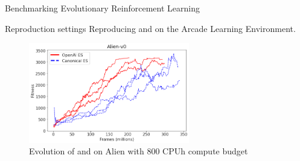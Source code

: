 \begin{frame}{\tcii{} Benchmarking Evolutionary Reinforcement Learning}

    \begin{block}{Reproduction settings}
        Reproducing \canonical{} \canonicalpaper{} and \openaies{} \openaipaper{} on the Arcade Learning Environment.
    \end{block}
    
    \begin{center}
        \begin{figure}
            \includegraphics[width=7cm]{images/BERL/Alien-v0.png}
            \caption{Evolution of \canonical{} and \openaies{} on Alien with 800 CPUh compute budget}
        \end{figure}
    \end{center}

\end{frame}
